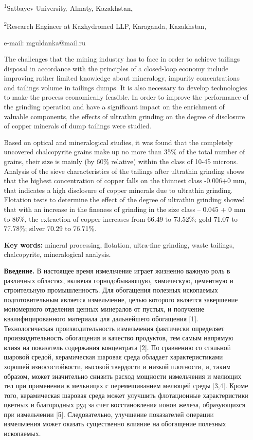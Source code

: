 \textsuperscript{1}Satbayev University, Almaty, Kazakhstan,

\textsuperscript{2}Research Engineer at Kazhydromed LLP, Karaganda,
Kazakhstan,

e-mail: mguldanka@mail.ru

The challenges that the mining industry has to face in order to achieve
tailings disposal in accordance with the principles of a closed-loop
economy include improving rather limited knowledge about mineralogy,
impurity concentrations and tailings volume in tailings dumps. It is
also necessary to develop technologies to make the process economically
feasible. In order to improve the performance of the grinding operation
and have a significant impact on the enrichment of valuable components,
the effects of ultrathin grinding on the degree of disclosure of copper
minerals of dump tailings were studied.

Based on optical and mineralogical studies, it was found that the
completely uncovered chalcopyrite grains make up no more than 35\% of
the total number of grains, their size is mainly (by 60\% relative)
within the class of 10-45 microns. Analysis of the sieve characteristics
of the tailings after ultrathin grinding shows that the highest
concentration of copper falls on the thinnest class -0.006+0 mm, that
indicates a high disclosure of copper minerals due to ultrathin
grinding. Flotation tests to determine the effect of the degree of
ultrathin grinding showed that with an increase in the fineness of
grinding in the size class -- 0.045 + 0 mm to 86\%, the extraction of
copper increases from 66.49 to 73.52\%; gold 71.07 to 77.78\%; silver
70.29 to 76.71\%.

{\bfseries Key words:} mineral processing, flotation, ultra-fine grinding,
waste tailings, chalcopyrite, mineralogical analysis.

{\bfseries Введение.} В настоящее время измельчение играет жизненно важную
роль в различных областях, включая горнодобывающую, химическую,
цементную и строительную промышленность. Для обогащения полезных
ископаемых подготовительным является измельчение, целью которого
является завершение мономерного отделения ценных минералов от пустых, и
получение квалифицированного материала для дальнейшего обогащения
{[}1{]}. Технологическая производительность измельчения фактически
определяет производительность обогащения и качество продуктов, тем самым
напрямую влияя на показатель содержания концентрата {[}2{]}. По
сравнению со стальной шаровой средой, керамическая шаровая среда
обладает характеристиками хорошей износостойкости, высокой твердости и
низкой плотности, и, таким образом, может значительно снизить расход
мощности измельчения и мелющих тел при применении в мельницах с
перемешиванием мелющей среды {[}3,4{]}. Кроме того, керамическая шаровая
среда может улучшить флотационные характеристики цветных и благородных
руд за счет восстановления ионов железа, образующихся при измельчении
{[}5{]}. Следовательно, улучшение показателей операции измельчения может
оказать существенно влияние на обогащение полезных ископаемых.

